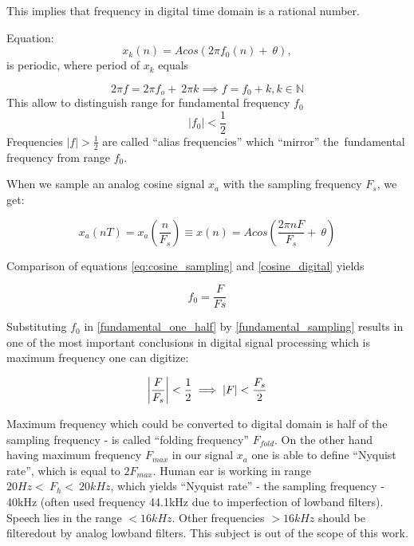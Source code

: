 This implies that frequency in digital time domain is a rational number.


Equation:
\begin{equation}
	x_k(n)=Acos(2\pi f_0(n) +~\theta),
\label{cosine_digital}
\end{equation}
is periodic, where period of $x_k$ equals


\begin{equation}
	2 \pi f = 2 \pi f_o +~2\pi k \implies f = f_0 + k, k \in \mathbb{N}
\end{equation}
This allow to distinguish range for fundamental frequency $f_0$
\begin{equation}
|f_0| < \frac{1}{2}
\label{fundamental_one_half}
\end{equation}
Frequencies $|f| > \frac{1}{2}$ are called ``alias frequencies'' which ``mirror'' the~fundamental frequency from range $f_0$.


When we sample an analog cosine signal $x_a$ with the sampling frequency $F_s$, we get:

\begin{equation}
x_a(nT)=x_a(\frac{n}{F_s}) \equiv x(n) = Acos(\frac{2\pi n F}{F_s} +~\theta) 
\label{eq:cosine_sampling}
\end{equation}

Comparison of equations \eqref{eq:cosine_sampling} and \eqref{cosine_digital} yields 

\begin{equation}
f_0 = \frac{F}{Fs}
\label{fundamental_sampling}
\end{equation}

Substituting $f_0$ in \eqref{fundamental_one_half} by \eqref{fundamental_sampling} results in one of the most important conclusions in digital signal processing which is maximum frequency one can digitize:

\begin{equation}
	\abs*{\frac{F}{F_s}} < \frac{1}{2} \implies \abs{F} < \frac{F_s}{2}
\end{equation}
 

Maximum frequency which could be converted to digital domain is half of the sampling frequency - is called ``folding frequency'' $F_{fold}$. On the other hand having maximum frequency $F_{max}$ in our signal $x_a$ one is able to define ``Nyquist rate'', which is equal to $2 F_{max}$. Human ear is working in range $20 Hz <~F_h <~20kHz$, which yields ``Nyquist rate'' - the sampling frequency - 40kHz (often used frequency 44.1kHz due to imperfection of low\dywiz band filters). Speech lies in the range $< 16kHz$. Other frequencies $> 16kHz$ should be filtered\dywiz out by analog low\dywiz band filters. This subject is out of the scope of this work. 

